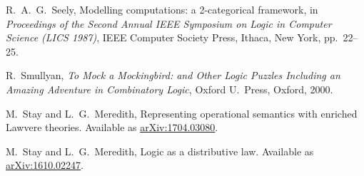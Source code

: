 \documentclass{amsart}
\theoremstyle{definition}
\begin{document}
\begin{thebibliography}{100}
 R.\ A.\ G.\ Seely, Modelling computations: a 2-categorical framework, in
\textsl{Proceedings of the Second Annual IEEE Symposium on Logic in Computer Science (LICS 1987)}, IEEE Computer Society Press, Ithaca, New York, pp.\ 22--25.
 

 R.\ Smullyan, \textsl{To Mock a Mockingbird: and Other Logic Puzzles Including an Amazing Adventure in Combinatory Logic}, Oxford U.\ Press, Oxford, 2000.
	
 M.\ Stay and L.\ G.\ Meredith, Representing operational semantics 
with enriched Lawvere theories.  Available as
\href{https://arxiv.org/abs/1704.03080}{arXiv:1704.03080}.

 M.\ Stay and L.\ G.\ Meredith, Logic as a distributive law.  Available as \href{https://arxiv.org/abs/1610.02247}{arXiv:1610.02247}.
  
\end{thebibliography}
\end{document}
